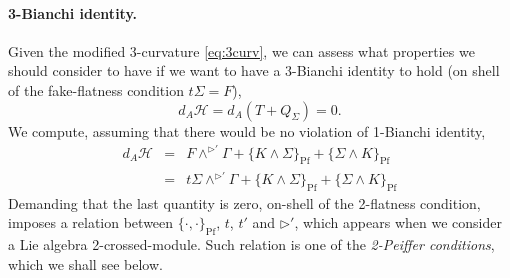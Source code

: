 \documentclass[onecolumn]{article}
\theoremstyle{theorem}
\theoremstyle{remark}
\theoremstyle{example}
\theoremstyle{definition}
\numberwithin{equation}{section}
\def\ker{\operatorname{ker}}
\begin{document}
\paragraph{{{3-Bianchi identity.} %
}}
Given the modified 3-curvature \eqref{eq:3curv}, we can assess what properties we should consider to have if we want to have a 3-Bianchi identity to hold (on shell of the fake-flatness condition $t\Sigma=F$), 
\begin{equation}
    d_A\mathcal{H} = d_A(T+Q_\Sigma) =0. \label{eq:3bian}
\end{equation}
{We}  compute, assuming that there would be %
no violation of 1-Bianchi identity,
\begin{eqnarray}
    d_A\mathcal{H} &=& F\wedge^{\rhd'}\Gamma + \{K\wedge \Sigma\}_\text{Pf} + \{\Sigma\wedge K\}_\text{Pf} \nonumber \\
    &=& t\Sigma\wedge^{\rhd'}\Gamma + \{K\wedge \Sigma\}_\text{Pf} + \{\Sigma\wedge K\}_\text{Pf} \nonumber
\end{eqnarray}
{Demanding} that the last quantity is zero, on-shell of the 2-flatness condition, imposes a relation between $\{\cdot,\cdot\}_\text{Pf}$, $t$, $t'$ and $\rhd'$, which appears when we consider a  Lie algebra 2-crossed-module. Such relation is one of the \textit{{2-Peiffer conditions}}, which we shall see below.  
\end{document}
